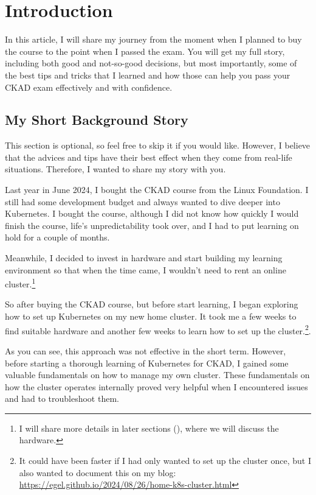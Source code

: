 
\section{Introduction}

In this article, I will share my journey from the moment when I planned to buy the course to the point when I passed the exam. You will get my full story, including both good and not-so-good decisions, but most importantly, some of the best tips and tricks that I learned and how those can help you pass your CKAD exam effectively and with confidence.

\subsection{My Short Background Story}

This section is optional, so feel free to skip it if you would like. However, I believe that the advices and tips have their best effect when they come from real-life situations. Therefore, I wanted to share my story with you.

Last year in June 2024, I bought the CKAD course from the Linux Foundation. I still had some development budget and always wanted to dive deeper into Kubernetes. I bought the course, although I did not know how quickly I would finish the course, life's unpredictability took over, and I had to put learning on hold for a couple of months.

Meanwhile, I decided to invest in hardware and start building my learning environment so that when the time came, I wouldn't need to rent an online cluster.\footnote{I will share more details in later sections (), where we will discuss the hardware.}

So after buying the CKAD course, but before start learning, I began exploring how to set up Kubernetes on my new home cluster. It took me a few weeks to find suitable hardware and another few weeks to learn how to set up the cluster.\footnote{It could have been faster if I had only wanted to set up the cluster once, but I also wanted to document this on my blog: \url{https://egel.github.io/2024/08/26/home-k8s-cluster.html}}.

As you can see, this approach was not effective in the short term. However, before starting a thorough learning of Kubernetes for CKAD, I gained some valuable fundamentals on how to manage my own cluster. These fundamentals on how the cluster operates internally proved very helpful when I encountered issues and had to troubleshoot them.

